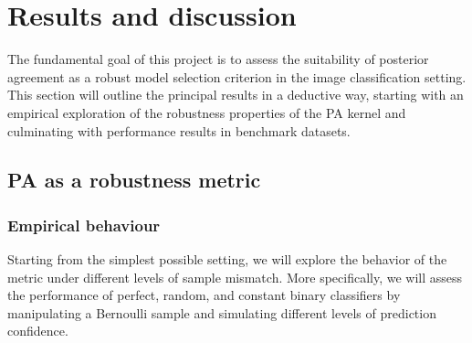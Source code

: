 \chapter{Results and discussion}\label{sec:results}

The fundamental goal of this project is to assess the suitability of posterior
agreement as a robust model selection criterion in the image classification setting.
This section will outline the principal results in a deductive way, starting with an 
empirical exploration of the robustness properties of the PA kernel and culminating
with performance results in benchmark datasets.

\section{PA as a robustness metric}\label{sec:results_robustness}

\subsection{Empirical behaviour}

Starting from the simplest possible setting, we will explore the behavior of the metric 
under different levels of sample mismatch. More specifically, we will assess the performance 
of perfect, random, and constant binary classifiers by manipulating a 
Bernoulli sample and simulating different levels of prediction confidence.

